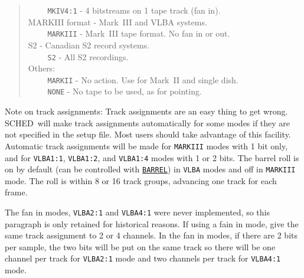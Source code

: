 \documentclass{report}
\newcommand{\schedb}{{\sc SCHED~}}
\begin{document}
\begin{verse}
\noindent ~~~~ {\tt MKIV4:1} - 4 bitstreams on 1 tape track (fan in).     \\
\noindent MARKIII format - Mark~III and VLBA systems. \\
\noindent ~~~~ {\tt MARKIII} - Mark~III tape format. No fan in or out.    \\
\noindent S2 - Canadian S2 record systems. \\
\noindent ~~~~ {\tt S2} - All S2 recordings. \\
\noindent Others:  \\
\noindent ~~~~ {\tt MARKII}  - No action. Use for Mark~II and single dish.\\
\noindent ~~~~ {\tt NONE}    - No tape to be used, as for pointing.       \\
\end{verse}

Note on track assignments: Track assignments are an easy thing to get
wrong. \schedb will make track assignments automatically for some
modes if they are not specified in the setup file.  Most users should
take advantage of this facility. Automatic track assignments will be
made for {\tt MARKIII} modes with 1 bit only, and for {\tt VLBA1:1},
{\tt VLBA1:2}, and {\tt VLBA1:4} modes with 1 or 2 bits. The barrel
roll is on by default (can be controlled with 
{\hyperref[SP:BARREL]{{\tt BARREL}}})
in {\tt VLBA} modes and off in {\tt MARKIII} mode. The
roll is within 8 or 16 track groups, advancing one track for each
frame.

The fan in modes, {\tt VLBA2:1} and {\tt VLBA4:1} were never implemented,
so this paragraph is only retained for historical reasons.
If using a fain in mode, give the same track
assignment to 2 or 4 channels.  In the fan in modes, if there are 2
bits per sample, the two bits will be put on the same track so there
will be one channel per track for {\tt VLBA2:1} mode and two channels
per track for {\tt VLBA4:1} mode.
\end{document}
